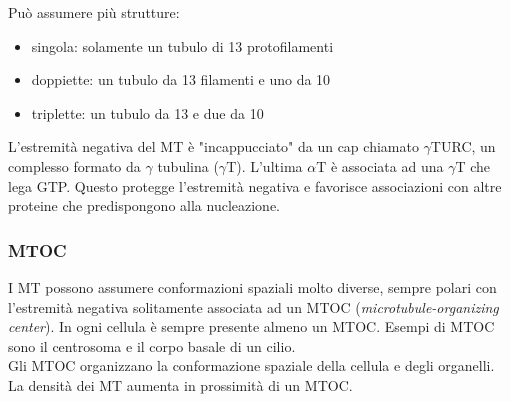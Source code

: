         Può assumere più strutture:
        \begin{itemize}
            \item singola: solamente un tubulo di 13 protofilamenti
            \item doppiette: un tubulo da 13 filamenti e uno da 10 
            \item triplette: un tubulo da 13 e due da 10
        \end{itemize}
        L'estremità negativa del MT è "incappucciato" da un cap chiamato $\gamma$TURC, un complesso formato da $\gamma$ tubulina ($\gamma$T). L'ultima $\alpha$T è associata ad una $\gamma$T che lega GTP.
        Questo protegge l'estremità negativa e favorisce associazioni con altre proteine che predispongono alla nucleazione.
        \subsubsection{MTOC}
            I MT possono assumere conformazioni spaziali molto diverse, sempre polari con l'estremità negativa solitamente associata ad un MTOC (\textit{microtubule-organizing center}). In ogni cellula è sempre presente almeno un MTOC. Esempi di MTOC sono il centrosoma e il corpo basale di un cilio.\\
            Gli MTOC organizzano la conformazione spaziale della cellula e degli organelli. La densità dei MT aumenta in prossimità di un MTOC.\\
            
